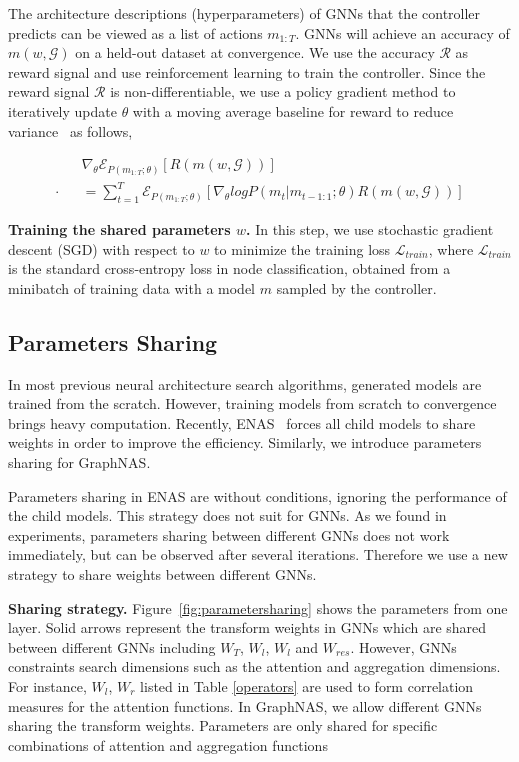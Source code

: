 \documentclass{article}
\begin{document}
The architecture descriptions (hyperparameters) of GNNs that the controller predicts can be viewed as a list of actions $m_{1:T}$. GNNs will achieve an accuracy of $m(w,\mathcal{G})$ on a held-out dataset at convergence. We use the accuracy $\mathcal{R}$ as reward signal and use reinforcement learning to train the controller. Since the reward signal $\mathcal{R}$ is non-differentiable, we use a policy gradient method to iteratively update $\theta$ with a moving average baseline for reward to reduce variance~\cite{Williams1992Simple} as follows, 
\begin{small}
	\begin{eqnarray}
	& &\nabla_{\theta}\mathcal{E}_{{P(m_{1:T};\theta)}}[R(m(w,\mathcal{G}))]~\\ \cdot
	& & =\sum_{t=1}^{T}\mathcal{E}_{P(m_{1:T};\theta)}[\nabla_{\theta}logP(m_{t}|m_{t-1:1};\theta)R(m(w,\mathcal{G}))]	\nonumber
	\end{eqnarray}
\end{small}

\textbf{Training the shared parameters $w $.}
In this step, we use stochastic gradient descent (SGD) with respect to $w$ to minimize the training loss $\mathcal{L}_{train}$, where  $\mathcal{L}_{train}$  is the standard cross-entropy loss in node classification, obtained from a minibatch of training data with a model $m$ sampled by the controller.

\subsection{Parameters Sharing}
In most previous neural architecture search algorithms, generated models are trained from the scratch. However, training  models from scratch to convergence brings heavy computation. Recently, ENAS~\cite{ENAS} forces all child models to share weights in order to improve the efficiency.  Similarly, we introduce parameters sharing for GraphNAS.

Parameters sharing in ENAS are without conditions, ignoring the performance of the child models. This strategy does not suit for GNNs. As we found in experiments, parameters sharing between different GNNs does not work immediately, but can be observed after several iterations. Therefore we use a new strategy to share weights between different GNNs. 

\textbf{Sharing strategy.} Figure~\ref{fig:parametersharing} shows the parameters from one layer. Solid arrows represent the transform weights in GNNs which are shared between different GNNs including $W_{T}$, $W_{l}$, $W_{l}$ and $W_{res}$. However, GNNs constraints search dimensions such as the attention and aggregation dimensions. For instance, $W_{l}$, $W_{r}$ listed in Table \ref{operators} are used to form correlation measures for the  attention functions. 
In GraphNAS, we allow different GNNs sharing the transform weights. Parameters are only shared for specific combinations of attention and aggregation functions
\end{document}

